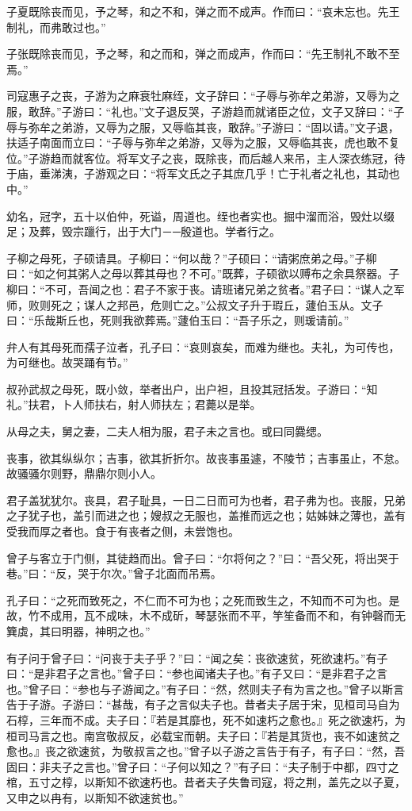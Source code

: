 \documentclass[]{article}
\begin{document}
子夏既除丧而见，予之琴，和之不和，弹之而不成声。作而曰：``哀未忘也。先王制礼，而弗敢过也。''

子张既除丧而见，予之琴，和之而和，弹之而成声，作而曰：``先王制礼不敢不至焉。''

司寇惠子之丧，子游为之麻衰牡麻绖，文子辞曰：``子辱与弥牟之弟游，又辱为之服，敢辞。''子游曰：``礼也。''文子退反哭，子游趋而就诸臣之位，文子又辞曰：``子辱与弥牟之弟游，又辱为之服，又辱临其丧，敢辞。''子游曰：``固以请。''文子退，扶适子南面而立曰：``子辱与弥牟之弟游，又辱为之服，又辱临其丧，虎也敢不复位。''子游趋而就客位。将军文子之丧，既除丧，而后越人来吊，主人深衣练冠，待于庙，垂涕洟，子游观之曰：``将军文氏之子其庶几乎！亡于礼者之礼也，其动也中。''

幼名，冠字，五十以伯仲，死谥，周道也。绖也者实也。掘中溜而浴，毁灶以缀足；及葬，毁宗躐行，出于大门－─殷道也。学者行之。

子柳之母死，子硕请具。子柳曰：``何以哉？''子硕曰：``请粥庶弟之母。''子柳曰：``如之何其粥人之母以葬其母也？不可。''既葬，子硕欲以赙布之余具祭器。子柳曰：``不可，吾闻之也：君子不家于丧。请班诸兄弟之贫者。''君子曰：``谋人之军师，败则死之；谋人之邦邑，危则亡之。''公叔文子升于瑕丘，蘧伯玉从。文子曰：``乐哉斯丘也，死则我欲葬焉。''蘧伯玉曰：``吾子乐之，则瑗请前。''

弁人有其母死而孺子泣者，孔子曰：``哀则哀矣，而难为继也。夫礼，为可传也，为可继也。故哭踊有节。''

叔孙武叔之母死，既小敛，举者出户，出户袒，且投其冠括发。子游曰：``知礼。''扶君，卜人师扶右，射人师扶左；君薨以是举。

从母之夫，舅之妻，二夫人相为服，君子未之言也。或曰同爨缌。

丧事，欲其纵纵尔；吉事，欲其折折尔。故丧事虽遽，不陵节；吉事虽止，不怠。故骚骚尔则野，鼎鼎尔则小人。

君子盖犹犹尔。丧具，君子耻具，一日二日而可为也者，君子弗为也。丧服，兄弟之子犹子也，盖引而进之也；嫂叔之无服也，盖推而远之也；姑姊妹之薄也，盖有受我而厚之者也。食于有丧者之侧，未尝饱也。

曾子与客立于门侧，其徒趋而出。曾子曰：``尔将何之？''曰：``吾父死，将出哭于巷。''曰：``反，哭于尔次。''曾子北面而吊焉。

孔子曰：``之死而致死之，不仁而不可为也；之死而致生之，不知而不可为也。是故，竹不成用，瓦不成味，木不成斫，琴瑟张而不平，竽笙备而不和，有钟磬而无簨虡，其曰明器，神明之也。''

有子问于曾子曰：``问丧于夫子乎？''曰：``闻之矣：丧欲速贫，死欲速朽。''有子曰：``是非君子之言也。''曾子曰：``参也闻诸夫子也。''有子又曰：``是非君子之言也。''曾子曰：``参也与子游闻之。''有子曰：``然，然则夫子有为言之也。''曾子以斯言告于子游。子游曰：``甚哉，有子之言似夫子也。昔者夫子居于宋，见桓司马自为石椁，三年而不成。夫子曰：『若是其靡也，死不如速朽之愈也。』死之欲速朽，为桓司马言之也。南宫敬叔反，必载宝而朝。夫子曰：『若是其货也，丧不如速贫之愈也。』丧之欲速贫，为敬叔言之也。''曾子以子游之言告于有子，有子曰：``然，吾固曰：非夫子之言也。''曾子曰：``子何以知之？''有子曰：``夫子制于中都，四寸之棺，五寸之椁，以斯知不欲速朽也。昔者夫子失鲁司寇，将之荆，盖先之以子夏，又申之以冉有，以斯知不欲速贫也。''
\end{document}
